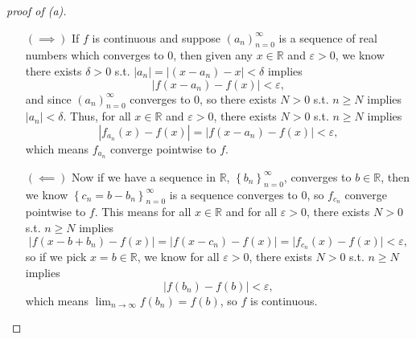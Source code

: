 \begin{proof}[proof of (a)]
  \vphantom{text}
  \begin{itemize}
    \item [\((\implies )\)] If \(f\) is continuous and suppose \(\left( a_n \right)_{n=0}^{\infty}  \) is a sequence of real numbers which converges to \(0\), then given any \(x \in \mathbb{R} \) and \(\varepsilon > 0\), we know there exists \(\delta > 0\) s.t. \(\vert a_n \vert = \vert (x - a_n) - x \vert < \delta \) implies 
    \[
      \vert f(x - a_n) - f(x) \vert < \varepsilon,
    \] and since \(\left( a_n \right)_{n=0}^{\infty}  \) converges to \(0\), so there exists \(N > 0\) s.t. \(n \ge N\) implies \(\vert a_n \vert < \delta \). Thus, for all \(x \in \mathbb{R} \) and \(\varepsilon > 0\), there exists \(N > 0\) s.t. \(n \ge N\) implies 
    \[
      \left\vert f_{a_n}(x) - f(x) \right\vert  = \vert f(x - a_n) - f(x) \vert < \varepsilon,
    \] which means \(f_{a_n}\) converge pointwise to \(f\).  
    \item [\((\impliedby )\)] Now if we have a sequence in \(\mathbb{R} \), \(\left\{ b_n \right\}_{n=0}^{\infty}  \), converges to \(b \in \mathbb{R} \), then we know \(\left\{ c_n = b - b_n \right\}_{n=0}^{\infty}  \) is a sequence converges to \(0\), so \(f_{c_n}\) converge pointwise to \(f\). This means for all \(x \in \mathbb{R} \) and for all \(\varepsilon > 0\), there exists \(N > 0\) s.t. \(n \ge N\) implies 
    \[
      \vert f(x - b + b_n) - f(x) \vert = \vert f(x - c_n) - f(x) \vert = \vert f_{c_n}(x) - f(x) \vert < \varepsilon,
    \]
    so if we pick \(x = b \in \mathbb{R} \), we know for all \(\varepsilon > 0\), there exists \(N > 0\) s.t. \(n \ge N\) implies 
    \[
      \vert f(b_n) - f(b) \vert < \varepsilon ,
    \] which means \(\lim_{n \to \infty} f(b_n) = f(b) \), so \(f\) is continuous.  
  \end{itemize}
\end{proof}
